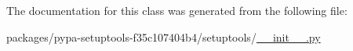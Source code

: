 The documentation for this class was generated from the following file\+:\begin{DoxyCompactItemize}
\item 
packages/pypa-\/setuptools-\/f35c107404b4/setuptools/\hyperlink{packages_2pypa-setuptools-f35c107404b4_2setuptools_2____init_____8py}{\+\_\+\+\_\+init\+\_\+\+\_\+.\+py}\end{DoxyCompactItemize}
